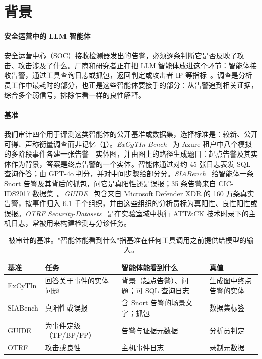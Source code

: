 \section{背景}
\label{sec:background}

\paragraph{安全运营中的 LLM 智能体} 安全运营中心（SOC）接收检测器发出的告警，必须逐条判断它是否反映了攻击、攻击涉及了什么。厂商和研究者正在把 LLM 智能体放进这个环节：智能体接收告警，通过工具查询日志或抓包，返回判定或攻击者 IP 等指标~\citep{guide,cortex,sentinelrl}。调查是分析员工作中最耗时的部分，也正是这些智能体要接手的部分：从告警追到相关证据，综合多个弱信号，排除乍看一样的良性解释。

\paragraph{基准} 我们审计四个用于评测这类智能体的公开基准或数据集，选择标准是：较新、公开可得、声称衡量调查而非记忆（\cref{tab:benchsetup}）。\emph{ExCyTIn-Bench}~\citep{excytin} 为 Azure 租户中八个模拟的多阶段事件各建一张告警—实体图，并由图上的路径生成题目：起点告警及其实体作为背景，答案是终点告警的一个实体。智能体通过对约 45 张日志表发 SQL 查询作答；由 GPT-4o 判分，并对中间步骤给部分分。\emph{SIABench}~\citep{siabench} 给智能体一条 Snort 告警及其背后的抓包，问它是真阳性还是误报；35 条告警来自 CIC-IDS2017 数据集~\citep{cicids2017}。\emph{GUIDE}~\citep{guide} 包含来自 Microsoft Defender XDR 的 160 万条真实告警，按事件归入 6.1 千个组织，并由这些组织的分析员标为真阳性、良性阳性或误报。\emph{OTRF Security-Datasets}~\citep{otrf} 是在实验室域中执行 ATT\&CK 技术时录下的主机日志，常被用来构建检测与分诊任务。

\begin{table}[t]
  \caption{被审计的基准。"智能体能看到什么"指基准在任何工具调用之前提供给模型的输入。}
  \label{tab:benchsetup}
  \centering\footnotesize
  \begin{tabular}{@{}p{1.25cm}p{1.75cm}p{2.2cm}p{1.75cm}@{}}
    \toprule
    基准 & 任务 & 智能体能看到什么 & 真值 \\
    \midrule
    ExCyTIn & 回答关于事件的实体问题 & 背景（起点告警）、问题；可 SQL 查询日志 & 生成图中终点告警的实体 \\
    SIABench & 真阳性或误报 & 含 Snort 告警的场景文字；抓包 & 数据集标签 \\
    GUIDE & 为事件定级（TP/BP/FP） & 告警与证据元数据 & 分析员判定 \\
    OTRF & 攻击或良性 & 主机事件日志 & 录制元数据 \\
    \bottomrule
  \end{tabular}
\end{table}

